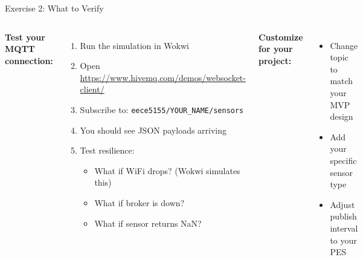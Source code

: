 \documentclass[aspectratio=169,11pt]{beamer}
\begin{document}
\begin{frame}[shrink=5]{Exercise 2: What to Verify}
    \begin{columns}
        \textbf{Test your MQTT connection:}
        \begin{enumerate}
            \item Run the simulation in Wokwi
            \item Open \url{https://www.hivemq.com/demos/websocket-client/}
            \item Subscribe to: \texttt{eece5155/YOUR\_NAME/sensors}
            \item You should see JSON payloads arriving
            \item Test resilience:
            \begin{itemize}
                \item What if WiFi drops? (Wokwi simulates this)
                \item What if broker is down?
                \item What if sensor returns NaN?
            \end{itemize}
        \end{enumerate}

        \vspace{0.1cm}
        \textbf{Customize for your project:}
        \begin{itemize}
            \item Change topic to match your MVP design
            \item Add your specific sensor type
            \item Adjust publish interval to your PES
        \end{itemize}

\end{columns}
\end{frame}
\end{document}
